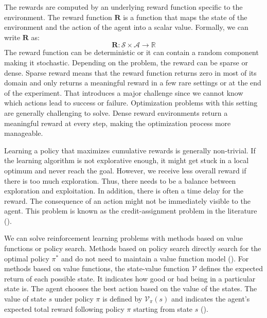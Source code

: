 The rewards are computed by an underlying reward function specific to the environment. The reward function $\mathbf{R}$ is a function that maps the state of the environment and the action of the agent into a scalar value. Formally, we can write $\mathbf{R}$ as:
\begin{equation*}
  \mathbf{R} : \mathcal{S} \times \mathcal{A} \rightarrow \mathbb{R}
\end{equation*}
The reward function can be deterministic or it can contain a random component making it stochastic. Depending on the problem, the reward can be sparse or dense. Sparse reward means that the reward function returns zero in most of its domain and only returns a meaningful reward in a few rare settings or at the end of the experiment. That introduces a major challenge since we cannot know which actions lead to success or failure. Optimization problems with this setting are generally challenging to solve. Dense reward environments return a meaningful reward at every step, making the optimization process more manageable.

Learning a policy that maximizes cumulative rewards is generally non-trivial. If the learning algorithm is not explorative enough, it might get stuck in a local optimum and never reach the goal. However, we receive less overall reward if there is too much exploration. Thus, there needs to be a balance between exploration and exploitation. In addition, there is often a time delay for the reward. The consequence of an action might not be immediately visible to the agent. This problem is known as the credit-assignment problem in the literature (\cite{sutton2018reinforcement}).

We can solve reinforcement learning problems with methods based on value functions or policy search. Methods based on policy search directly search for the optimal policy $\pi^*$ and do not need to maintain a value function model (\cite{8103164}). For methods based on value functions, the state-value function $\mathcal{V}$ defines the expected return of each possible state. It indicates how good or bad being in a particular state is. The agent chooses the best action based on the value of the states. The value of state $s$ under policy $\pi$ is defined by $\mathcal{V}_\pi(s)$ and indicates the agent's expected total reward following policy $\pi$ starting from state $s$ (\cite{sutton2018reinforcement}).

